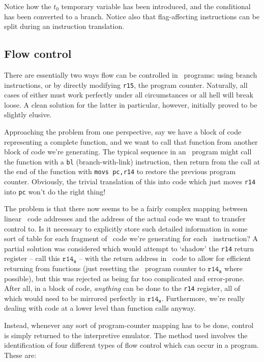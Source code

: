 Notice how the $t_0$ temporary variable has been introduced, and the conditional has been converted to a branch. Notice also that flag-affecting instructions can be split during an instruction translation.

\subsection{Flow control}

There are essentially two ways flow can be controlled in \arm\ programs: using branch instructions, or by directly modifying {\tt r15}, the program counter. Naturally, all cases of either must work perfectly under all circumstances or all hell will break loose. A clean solution for the latter in particular, however, initially proved to be slightly elusive.

Approaching the problem from one perspective, say we have a block of code representing a complete function, and we want to call that function from another block of code we're generating. The typical sequence in an \arm\ program might call the function with a {\tt bl} (branch-with-link) instruction, then return from the call at the end of the function with {\tt movs pc,r14} to restore the previous program counter. Obviously, the trivial translation of this into code which just moves {\tt r14} into {\tt pc} won't do the right thing!

The problem is that there now seems to be a fairly complex mapping between linear \arm\ code addresses and the address of the actual code we want to transfer control to. Is it necessary to explicitly store such detailed information in some sort of table for each fragment of \ia\ code we're generating for each \arm\ instruction? A partial solution was considered which would attempt to `shadow' the {\tt r14} return register -- call this $\mathtt{r14_s}$ -- with the return address in \ia\ code to allow for efficient returning from functions (just resetting the \ia\ program counter to $\mathtt{r14_s}$ where possible), but this was rejected as being far too complicated and error-prone. After all, in a block of code, {\it anything} can be done to the {\tt r14} register, all of which would need to be mirrored perfectly in $\mathtt{r14_s}$. Furthermore, we're really dealing with code at a lower level than function calls anyway.

Instead, whenever any sort of program-counter mapping has to be done, control is simply returned to the interpretive emulator. The method used involves the identification of four different types of flow control which can occur in a program. These are:

